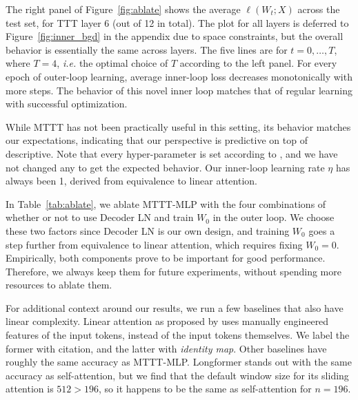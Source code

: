 \documentclass{article}
\begin{document}
The right panel of Figure~\ref{fig:ablate} shows the average $\ell(W_t; X)$ across the test set, for TTT layer 6 (out of 12 in total).
The plot for all layers is deferred to Figure~\ref{fig:inner_bgd} in the appendix due to space constraints, but the overall behavior is essentially the same across layers.
The five lines are for $t=0,\dots,T$, where $T=4$, \textit{i.e.} the optimal choice of $T$ according to the left panel.
For every epoch of outer-loop learning, average inner-loop loss decreases monotonically with more steps.
The behavior of this novel inner loop matches that of regular learning with successful optimization.

While MTTT has not been practically useful in this setting, its behavior matches our expectations, indicating that our perspective is predictive on top of descriptive. 
Note that every hyper-parameter is set according to \cite{beyer2022better}, and we have not changed any to get the expected behavior.
Our inner-loop learning rate $\eta$ has always been 1, derived from equivalence to linear attention.

In Table~\ref{tab:ablate}, we ablate MTTT-MLP with the four combinations of whether or not to use Decoder LN and train $W_0$ in the outer loop.
We choose these two factors since Decoder LN is our own design, and training $W_0$ goes a step further from equivalence to linear attention, which requires fixing $W_0=0$.
Empirically, both components prove to be important for good performance. 
Therefore, we always keep them for future experiments, without spending more resources to ablate them.

For additional context around our results, we run a few baselines that also have linear complexity. Linear attention as proposed by \cite{katharopoulos2020transformers} uses manually engineered features of the input tokens, instead of the input tokens themselves. We label the former with citation, and the latter with \emph{identity map}. Other baselines have roughly the same accuracy as MTTT-MLP. Longformer stands out with the same accuracy as self-attention, but we find that the default window size for its sliding attention is $512 > 196$, so it happens to be the same as self-attention for $n=196$.
\end{document}
